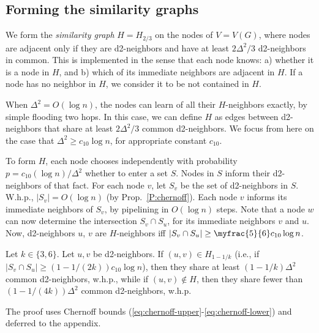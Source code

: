 \subsection{Forming the similarity graphs} 
\label{ssec:similarity}
%
We form the \emph{similarity graph} $H = H_{2/3}$ on the nodes of $V = V(G)$, where nodes are adjacent only if they are d2-neighbors and have at least $2\Delta^2/3$ d2-neighbors in common.
This is implemented in the sense that each node knows:
a) whether it is a node in $H$, and
b) which of its immediate neighbors are adjacent in $H$.
If a node has no neighbor in $H$, we consider it to be not contained in $H$.

When $\Delta^2 = O(\log n)$, the nodes can learn of all their $H$-neighbors exactly, by simple flooding two hops. In this case, we can define $H$ as edges between d2-neighbors that share at least $2\Delta^2/3$ common d2-neighbors. We focus from here on the case that $\Delta^2 \ge c_{10}\log n$, for appropriate constant $c_{10}$.

To form $H$, each node chooses independently with probability $p = c_{10}(\log n)/\Delta^2$ whether to enter a set $S$. Nodes in $S$ inform their d2-neighbors of that fact. For each node $v$, let $S_v$ be the set of d2-neighbors in $S$. W.h.p., $|S_v| = O(\log n)$ (by Prop.~\ref{P:chernoff}). Each node $v$ informs its immediate neighbors of $S_v$, by pipelining in $O(\log n)$ steps.
Note that a node $w$ can now determine the intersection $S_v \cap S_u$, for its immediate neighbors $v$ and $u$.
Now, d2-neighbors $u$, $v$ are $H$-neighbors iff $|S_v \cap S_u| \ge \myfrac{5}{6} c_{10} \log n$. 
\begin{theorem}
Let $k \in \{3,6\}$.
Let $u,v$ be d2-neighbors. 
If $(u,v) \in H_{1-1/k}$ (i.e., if $|S_v \cap S_u| \ge (1-1/(2k)) c_{10} \log n$), then they share at least $(1-1/k) \Delta^2$ common d2-neighbors, w.h.p.,
while if $(u,v) \not\in H$, then they share fewer than $(1-1/(4k)) \Delta^2$ common d2-neighbors, w.h.p.
\label{T:similarity}
\end{theorem}
The proof uses Chernoff bounds (\ref{eq:chernoff-upper}-\ref{eq:chernoff-lower}) and deferred to the appendix. 



